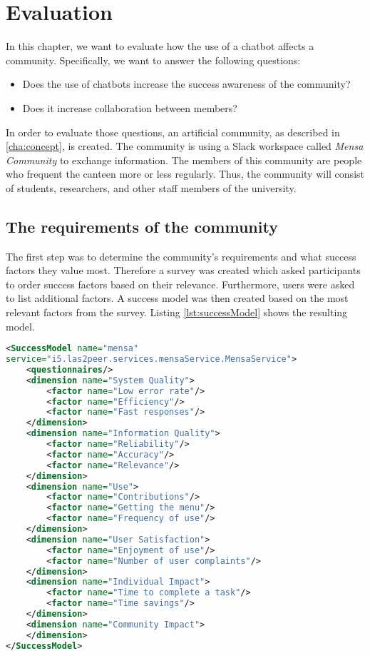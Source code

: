 \chapter{Evaluation}\label{cha:eval}
In this chapter, we want to evaluate how the use of a chatbot affects a community.
Specifically, we want to answer the following questions:
\begin{itemize}
    \item Does the use of chatbots increase the success awareness of the community?
    \item Does it increase collaboration between members?
\end{itemize}

In order to evaluate those questions, an artificial community, as described in \ref{cha:concept}, is created.  
The community is using a Slack workspace called \emph{Mensa Community} to exchange information.
The members of this community are people who frequent the canteen more or less regularly.
Thus, the community will consist of students, researchers, and other staff members of the university.

\section{The requirements of the community}
The first step was to determine the community's requirements and what success factors they value most.
Therefore a survey was created which asked participants to order success factors based on their relevance. 
Furthermore, users were asked to list additional factors.
A success model was then created based on the most relevant factors from the survey. Listing \ref{lst:successModel} shows the resulting model.

\begin{lstlisting}[language=XML,caption=Success Model based on requirements,captionpos=b, label=lst:successModel]
<SuccessModel name="mensa" 
service="i5.las2peer.services.mensaService.MensaService">
    <questionnaires/>
    <dimension name="System Quality">
        <factor name="Low error rate"/>
        <factor name="Efficiency"/>
        <factor name="Fast responses"/>
    </dimension>
    <dimension name="Information Quality">
        <factor name="Reliability"/>
        <factor name="Accuracy"/>
        <factor name="Relevance"/>
    </dimension>
    <dimension name="Use">
        <factor name="Contributions"/>
        <factor name="Getting the menu"/>
        <factor name="Frequency of use"/>
    </dimension>
    <dimension name="User Satisfaction">
        <factor name="Enjoyment of use"/>
        <factor name="Number of user complaints"/>
    </dimension>
    <dimension name="Individual Impact">
        <factor name="Time to complete a task"/>
        <factor name="Time savings"/>
    </dimension>
    <dimension name="Community Impact">
    </dimension>
</SuccessModel>
\end{lstlisting}

